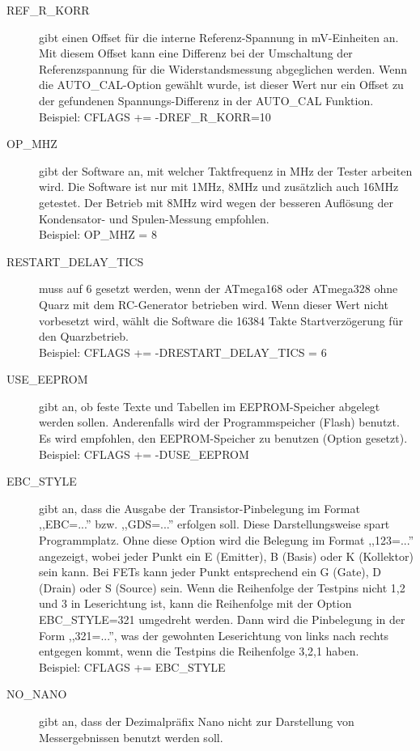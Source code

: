 \begin{description}
  \item[REF\_R\_KORR] gibt einen Offset für die interne Referenz-Spannung in mV-Einheiten an.
Mit diesem Offset kann eine Differenz bei der Umschaltung der Referenzspannung für die Widerstandsmessung abgeglichen werden.
Wenn die AUTO\_CAL-Option gewählt wurde, ist dieser Wert nur ein Offset zu der gefundenen Spannungs-Differenz in der
AUTO\_CAL Funktion.\\
Beispiel: CFLAGS += -DREF\_R\_KORR=10
  \item[OP\_MHZ] gibt der Software an, mit welcher Taktfrequenz in MHz der Tester arbeiten wird.
Die Software ist nur mit 1MHz, 8MHz und zusätzlich auch 16MHz getestet. Der Betrieb mit 8MHz wird wegen der besseren Auflösung der
Kondensator- und Spulen-Messung empfohlen.\\
Beispiel: OP\_MHZ = 8
  \item[RESTART\_DELAY\_TICS] muss auf 6 gesetzt werden, wenn der ATmega168 oder ATmega328 ohne Quarz mit dem
RC-Generator betrieben wird. Wenn dieser Wert nicht vorbesetzt wird, wählt die Software die 16384 Takte Startverzögerung für
den Quarzbetrieb.\\
Beispiel: CFLAGS += -DRESTART\_DELAY\_TICS = 6
  \item[USE\_EEPROM] gibt an, ob feste Texte und Tabellen im EEPROM-Speicher abgelegt werden sollen.
Anderenfalls wird der Programmspeicher (Flash) benutzt.
Es wird empfohlen, den EEPROM-Speicher zu benutzen (Option gesetzt).\\
Beispiel: CFLAGS += -DUSE\_EEPROM
  \item[EBC\_STYLE] gibt an, dass die Ausgabe der Transistor-Pinbelegung im Format ,,EBC=...'' bzw. ,,GDS=...'' erfolgen soll.
Diese Darstellungsweise spart Programmplatz. Ohne diese Option wird die Belegung im Format ,,123=...'' angezeigt, wobei
jeder Punkt ein E (Emitter), B (Basis) oder K (Kollektor) sein kann.
Bei FETs kann jeder Punkt entsprechend ein G (Gate), D (Drain) oder S (Source) sein.
Wenn die Reihenfolge der Testpins nicht 1,2 und 3 in Leserichtung ist, kann die Reihenfolge mit der Option EBC\_STYLE=321 
umgedreht werden. Dann wird die Pinbelegung in der Form ,,321=...'', was der gewohnten Leserichtung von links nach rechts
entgegen kommt, wenn die Testpins die Reihenfolge 3,2,1 haben.\\
Beispiel: CFLAGS += EBC\_STYLE
  \item[NO\_NANO] gibt an, dass der Dezimalpräfix Nano nicht zur Darstellung von Messergebnissen benutzt werden soll.

\end{description}
